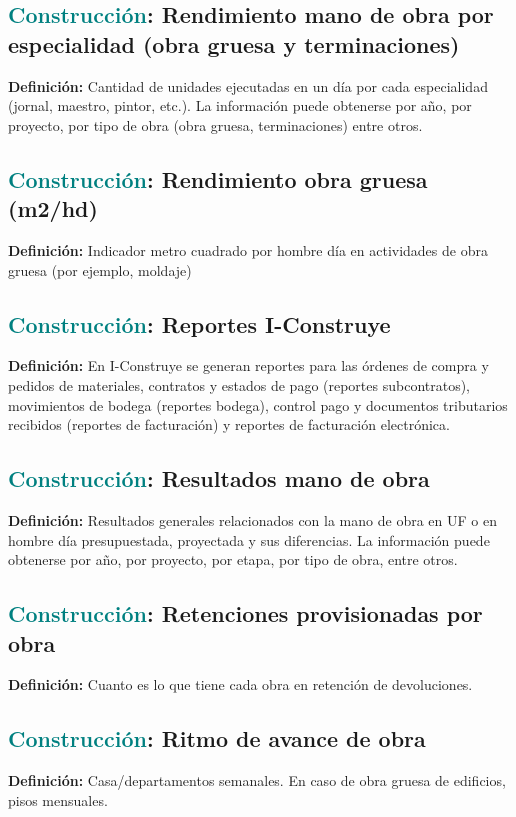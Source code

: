 \documentclass[12pt]{article}
\begin{document}
\subsection{\textcolor{teal}{Construcción}: Rendimiento mano de obra por especialidad (obra gruesa y terminaciones)}
\textbf{Definición:} Cantidad de unidades ejecutadas en un día por cada especialidad (jornal, maestro, pintor, etc.). La información puede obtenerse por año, por proyecto, por tipo de obra (obra gruesa, terminaciones) entre otros.
\subsection{\textcolor{teal}{Construcción}: Rendimiento obra gruesa (m2/hd)}
\textbf{Definición:} Indicador metro cuadrado por hombre día en actividades de obra gruesa (por ejemplo, moldaje)
\subsection{\textcolor{teal}{Construcción}: Reportes I-Construye}
\textbf{Definición:} En I-Construye se generan reportes para las órdenes de compra y pedidos de materiales, contratos y estados de pago (reportes subcontratos), movimientos de bodega (reportes bodega), control pago y documentos tributarios recibidos (reportes de facturación) y reportes de facturación electrónica.
\subsection{\textcolor{teal}{Construcción}: Resultados mano de obra}
\textbf{Definición:} Resultados generales relacionados con la mano de obra en UF o en hombre día presupuestada, proyectada y sus diferencias. La información puede obtenerse por año, por proyecto, por etapa, por tipo de obra, entre otros.
\subsection{\textcolor{teal}{Construcción}: Retenciones provisionadas por obra}
\textbf{Definición:} Cuanto es lo que tiene cada obra en retención de devoluciones.
\subsection{\textcolor{teal}{Construcción}: Ritmo de avance de obra}
\textbf{Definición:} Casa/departamentos semanales. En caso de obra gruesa de edificios, pisos mensuales.
\end{document}
